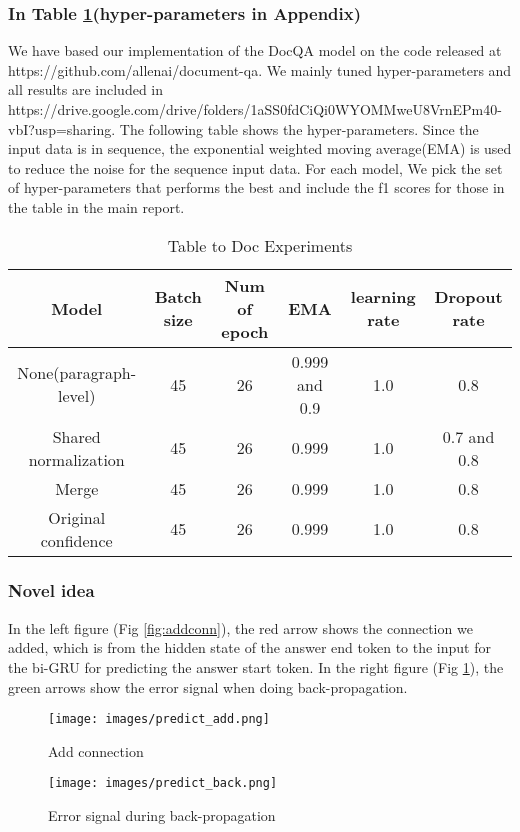 \documentclass{article}
\begin{document}
\subsubsection{In Table \ref{table:3}(hyper-parameters in Appendix)}
We have based our implementation of the DocQA model on the code released at https://github.com/allenai/document-qa. We mainly tuned hyper-parameters and all results are included in https://drive.google.com/drive/folders/1aSS0fdCiQi0WYOMMweU8VrnEPm40-vbI?usp=sharing. The following table shows the hyper-parameters. Since the input data is in sequence, the exponential weighted moving average(EMA) is used to reduce the noise for the sequence input data. For each model, We pick the set of hyper-parameters that performs the best and include the f1 scores for those in the table in the main report.
\begin{table}[h!]
    \centering
     \begin{tabular}{||c c c c c c||} 
     \hline
      Model & Batch size & Num of epoch & EMA & learning rate & Dropout rate\\ 
     \hline\hline
      None(paragraph-level)&  45 & 26 & 0.999 and 0.9 & 1.0 & 0.8\\ 
      Shared normalization&  45 & 26 & 0.999 & 1.0 & 0.7 and 0.8\\ 
      Merge&  45 & 26 & 0.999 & 1.0 &  0.8\\
      Original confidence&  45 & 26 & 0.999 & 1.0 &  0.8\\
     \hline\hline
    \end{tabular}
    \caption{Table to Doc Experiments}
    \label{table:3}
\end{table}

\subsubsection{Novel idea}
In the left figure (Fig \ref{fig:addconn}), the red arrow shows the connection we added, which is from the hidden state of the answer end token to the input for the bi-GRU for predicting the answer start token. In the right figure (Fig \ref{fig:errorsignal}), the green arrows show the error signal when doing back-propagation.
\begin{figure}[h]
    \centering
    \begin{minipage}{0.4\textwidth}
        \centering
        \texttt{[image: images/predict\_add.png]}
        \caption{Add connection}
        \label{fig:addconn}
    \end{minipage}\hfill
    \begin{minipage}{0.4\textwidth}
        \centering
        \texttt{[image: images/predict\_back.png]}
        \caption{Error signal during back-propagation}
        \label{fig:errorsignal}
    \end{minipage}
\end{figure}
\end{document}

